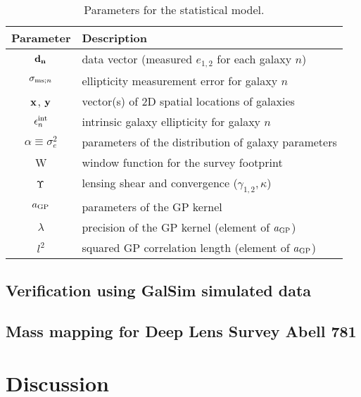 \begin{table}%
\begin{center}
\caption{Parameters for the statistical model.}
\label{tab:sampling_parameters}
\begin{tabular}{cl}
\hline
Parameter & Description \\
\hline
${\bf d_{n}}$ & data vector (measured $e_{1,2}$ for each galaxy $n$)  \\
$\sigma_{{\rm ms}; n}$ & ellipticity measurement error for galaxy $n$ 
\\
$\mathbf{x}$, $\mathbf{y}$ & vector(s) of 2D spatial locations of galaxies \\
$\epsilon_n^{\rm int}$ & intrinsic galaxy ellipticity for galaxy $n$ \\
$\alpha\equiv\sigma_{e}^2$ & parameters of the distribution of galaxy parameters \\
W & window function for the survey footprint \\
$\Upsilon$ & lensing shear and convergence ($\gamma_{1,2}, \kappa$) \\
$a_{\rm GP}$ & parameters of the GP kernel\\
$\lambda$ & precision of the GP kernel (element of $a_{\rm GP}$) \\
$l^2$ & squared GP correlation length (element of $a_{\rm GP}$) \\
\hline
\end{tabular}
\end{center}
\end{table}



\subsection{Verification using {\sc GalSim} simulated data}
\subsection{Mass mapping for Deep Lens Survey Abell 781}


\section{Discussion}

